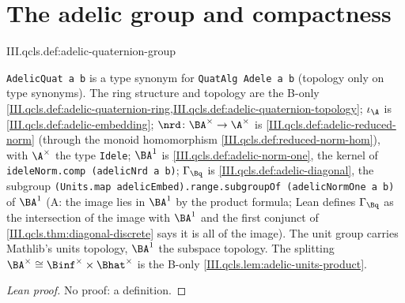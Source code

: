 \section{The adelic group and compactness}\label{sec:qcls-compact}

\begin{definition}
\end{definition}
\begin{tfformal}{III.qcls.def:adelic-quaternion-group}
\begin{tffidelity}
\texttt{AdelicQuat a b} is a type synonym for \texttt{QuatAlg Adele a b} (topology only on type synonyms). The ring structure and topology are the B-only \cref{III.qcls.def:adelic-quaternion-ring,III.qcls.def:adelic-quaternion-topology}; $\iota_\A$ is \cref{III.qcls.def:adelic-embedding}; $\nrd\colon\BA^\times\to\A^\times$ is \cref{III.qcls.def:adelic-reduced-norm} (through the monoid homomorphism \cref{III.qcls.def:reduced-norm-hom}), with $\A^\times$ the type \texttt{Idele}; $\BA^1$ is \cref{III.qcls.def:adelic-norm-one}, the kernel of \texttt{ideleNorm.comp (adelicNrd a b)}; $\Gamma_{\Bq}$ is \cref{III.qcls.def:adelic-diagonal}, the subgroup \texttt{(Units.map adelicEmbed).range.subgroupOf (adelicNormOne a b)} of $\BA^1$ (A: the image lies in $\BA^1$ by the product formula; Lean defines $\Gamma_{\Bq}$ as the intersection of the image with $\BA^1$ and the first conjunct of \cref{III.qcls.thm:diagonal-discrete} says it is all of the image). The unit group carries Mathlib's units topology, $\BA^1$ the subspace topology. The splitting $\BA^\times\cong\Binf^\times\times\Bhat^\times$ is the B-only \cref{III.qcls.lem:adelic-units-product}.
\end{tffidelity}
\end{tfformal}
\begin{proof}[Lean proof]
No proof: a definition.
\end{proof}

